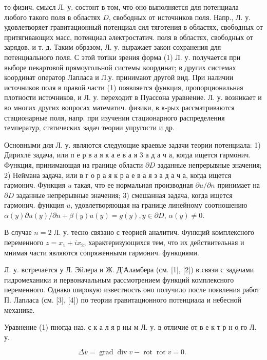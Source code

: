 \documentclass[10pt]{article}
\begin{document}
то физич. смысл Л. у. состонт в том, что оно выполняется для потенциала любого такого поля в областях $D$, свободных от источников поля. Напр., Л. у. удовлетворяет гравитационный потенциал сил тяготения в областях, свободных от притягивающих масс, потенциал әлектростатич. поля в областях, свободных от зарядов, и т. д. Таким образом, Л. у. выражает закон сохранения для потенциального поля. С этой тотіки зрения форма (1) Л. у. получается при выборе пекартовой прямоугольной системы координат; в других системах координат оператор Лапласа и Л.у. принимают другой вид. При наличии источников поля в правой части (1) появляется функция, пропорциональная плотности источников, и Л. у. переходит в Пуассона уравнение. Л. у. возникает и во многих других вопросах математич. физики, в к-рых рассматриваются стационарные поля, напр. при изучении стационарного распределения температур, статических задач теории упругости и др.



Основными для Л. у. являются следующие краевые задачи теории потенциала: 1) Дирихле задача, или п е р в а я к а е в а я 3 а д а ч а, когда ищется гармонич. Функция, принимающая на границе области $\partial D$ заданные непрерывные значения; 2) Неймана задача, или в г о р а я к р а е в а я з а д а ч а, когда ищется гармонич. Функция $u$ такая, что ее нормальная производная $\partial u / \partial n$ принимает на $\partial D$ заданные непрерывные значения; 3) смешанная задача, когда ищется гармонич. функция $u$, удовлетворяющая на границе линейному соотношению $\alpha(y) \partial u(y) / \partial n+\beta(y) u(y)=g(y), y \in \partial D$, $\alpha(y) \neq 0$.



В случае $n=2$ Л. у. тесно связано с теорией аналитич. Функций комплексного переменного $z=x_{1}+i x_{2}$, характеризующихся тем, что их действительная и мнимая части являются сопряженными гармонич. функциями.



Л. у. встречается у Л. Эйлера и Ж. Д'Аламбера (см. [1], [2]) в связи с задачами гидромеханики и первоначальным рассмотрением функций комплексного переменного. Однако широкую известность оно получило после появления работ П. Лапласа (см. [3], [4]) по теории гравитационного потенциала и небесной механике.



Уравнение (1) пногда наз. с к а л я р ны м Л. у. в отличие от в е к т р н о го Л. у.



\[

\Delta v=\operatorname{grad} \operatorname{div} v-\operatorname{rot} \operatorname{rot} v=0 \text {. }

\]
\end{document}
